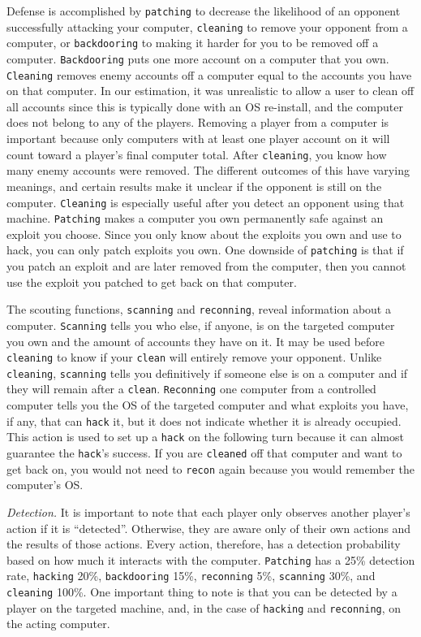 \documentclass{sig-alternate-05-2015}
\begin{document}
Defense is accomplished by {\tt patching} to decrease the likelihood of an opponent successfully attacking your computer, {\tt cleaning} to remove your opponent from a computer, or {\tt backdooring} to making it harder for you to be removed off a computer. 
{\tt Backdooring} puts one more account on a computer that you own. 
{\tt Cleaning} removes enemy accounts off a computer equal to the accounts you have on that computer.
In our estimation, it was unrealistic to allow a user to clean off all accounts since this is typically done with an OS re-install, and the computer does not belong to any of the players.
Removing a player from a computer is important because only computers with at least one player account on it will count toward a player's final computer total. 
After {\tt cleaning}, you know how many enemy accounts were removed.  
The different outcomes of this have varying meanings, and certain results make it unclear if the opponent is still on the computer. 
{\tt Cleaning} is especially useful after you detect an opponent using that machine.
{\tt Patching} makes a computer you own permanently safe against an exploit you choose. Since you only know about the exploits you own and use to hack, you can only patch exploits you own. 
One downside of {\tt patching} is that if you patch an exploit and are later removed from the computer, then you cannot use the exploit you patched to get back on that computer. 

The scouting functions, {\tt scanning} and {\tt reconning}, reveal information about a computer. {\tt Scanning} tells you who else, if anyone, is on the targeted computer you own and the amount of accounts they have on it.  It may be used before {\tt cleaning} to know if your {\tt clean} will entirely remove your opponent. Unlike {\tt cleaning}, {\tt scanning} tells you definitively if someone else is on a computer and if they will remain after a {\tt clean}.  {\tt Reconning} one computer from a controlled computer tells you the OS of the targeted computer and what exploits you have, if any, that can {\tt hack} it, but it does not indicate whether it is already occupied. This action is used to set up a {\tt hack} on the following turn because it can almost guarantee the {\tt hack}'s success.  If you are {\tt cleaned} off that computer and want to get back on, you would not need to {\tt recon} again because you would remember the computer's OS.

{\em Detection.}
It is important to note that each player only observes another player's action if it is ``detected''. 
Otherwise, they are aware only of their own actions and the results of those actions. 
Every action, therefore, has a detection probability based on how much it interacts with the computer.  
{\tt Patching} has a 25\% detection rate, {\tt hacking} 20\%, {\tt backdooring} 15\%, {\tt reconning} 5\%, {\tt scanning} 30\%, and {\tt cleaning} 100\%. 
One important thing to note is that you can be detected by a player on the targeted machine, and, in the case of {\tt hacking} and {\tt reconning}, on the acting computer. 
\end{document}
